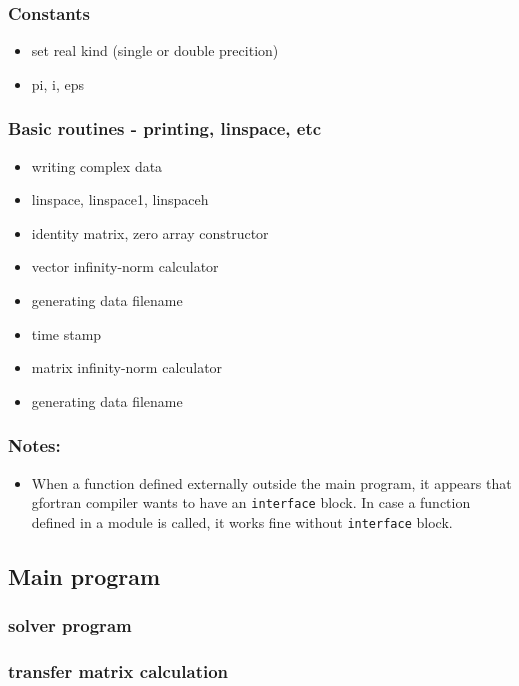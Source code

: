 \documentclass[11pt]{article}
\begin{document}
\subsubsection{Constants}
\label{sec:org5e7249f}
\begin{itemize}
\item set real kind (single or double precition)
\item pi, i, eps
\end{itemize}
\subsubsection{Basic routines - printing, linspace, etc}
\label{sec:orga952248}
\begin{itemize}
\item\relax [SR] writing complex data
\item\relax [FN] linspace, linspace1, linspaceh
\item\relax [FN] identity matrix, zero array constructor
\item\relax [FN] vector infinity-norm calculator
\item\relax [FN] generating data filename
\item\relax [SR] time stamp
\item\relax [FN] matrix infinity-norm calculator
\item\relax [SR] generating data filename
\end{itemize}
\subsubsection{Notes:}
\label{sec:orgad8991a}
\begin{itemize}
\item When a function defined externally outside the main program, it appears that gfortran compiler wants to have an \texttt{interface} block. In case a function defined in a module is called, it works fine without \texttt{interface} block.
\end{itemize}
\subsection{Main program}
\label{sec:org715b463}
\subsubsection{solver program}
\label{sec:org6e7e368}
\subsubsection{transfer matrix calculation}
\label{sec:org664a940}
\end{document}

